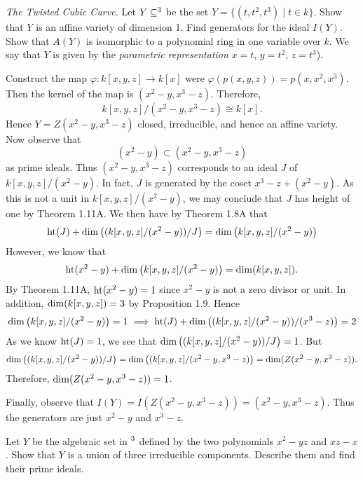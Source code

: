 \documentclass{hw_pset} %
\DeclareMathOperator{\Ht}{\rm{ht}}    %
\DeclareMathOperator{\Dim}{\rm{dim}}  %
\let\aa\relax
\DeclareMathOperator{\aa}{\mathbf{A}} %
\renewcommand{\phi}{\varphi}
\begin{document}
\begin{exercise}[1.2]
    \emph{The Twisted Cubic Curve.}
    Let $Y \subseteq \aa^3$ be the set $Y = \{(t,t^2,t^3) \mid t \in k\}$.
    Show that $Y$ is an affine variety of dimension 1. Find generators 
    for the ideal $I(Y)$. Show that $A(Y)$ is isomorphic to a polynomial ring 
    in one variable over $k$. We say that $Y$ is given by the \emph{parametric representation} 
    $x = t$, $y = t^2$, $z = t^3$). 
\end{exercise}

\begin{solution}
    Construct the map $\phi: k[x,y,z] \to k[x]$ were 
    $\phi(p(x, y, z)) = p(x, x^2, x^3)$. Then the kernel of the 
    map is $(x^2 - y, x^3 - z)$. Therefore, 
    \[
        k[x,y,z]/(x^2 - y, x^3 - z) \cong k[x]. 
    \]
    Hence $Y = Z(x^2 -y, x^3 - z)$ closed, irreducible, and hence an affine 
    variety. 
    Now observe that 
    \[
        (x^2 - y) \subset (x^2 - y, x^3 - z)
    \]
    as prime ideals. Thus $(x^2 - y, x^3 - z)$ corresponds to 
    an ideal $J$ of $k[x,y,z]/(x^2 - y)$. In fact, $J$ is generated by 
    the coset $x^3 - z + (x^2 - y)$. As this is not a unit in $k[x,y,z]/(x^2 - y)$, 
    we may conclude that $J$ has height of one by Theorem 1.11A. We then have by 
    Theorem 1.8A that 
    \[
        \Ht(J) + \Dim\left( (k[x,y,z]/(x^2 - y))/J \right) = \Dim\left( k[x,y,z]/(x^2 - y) \right)
    \]
    However, we know that 
    \[
        \Ht(x^2 - y) + \Dim\left( k[x,y,z]/(x^2 - y) \right) = \Dim( k[x,y,z]).
    \]
    By Theorem 1.11A, $\Ht(x^2 - y) = 1$ since $x^2 - y$ is not a zero divisor or unit.
    In addition, $\Dim(k[x,y,z]) = 3$ by Proposition 1.9. Hence 
    \[
        \Dim\left( k[x,y,z]/(x^2 - y) \right) = 1 \implies 
        \Ht(J) + \Dim\left( (k[x,y,z]/(x^2 - y))/(x^3 - z) \right)
        = 2
    \]
    As we know $\Ht(J) = 1$, we see that 
    $\Dim\left( (k[x,y,z]/(x^2 - y))/J \right) = 1$. 
    But 
    \[
        \Dim\left( (k[x,y,z]/(x^2 - y))/J \right) = 
        \Dim\left( (k[x,y,z]/(x^2 - y, x^3 - z) \right) 
        = \Dim(Z(x^2 - y, x^3 - z)).
    \]
    Therefore, $\Dim(Z(x^2 - y, x^3 - z)) = 1$. 

    Finally, observe that $I(Y) = I(Z(x^2-y, x^3 - z)) = (x^2 - y, x^3 - z)$. 
    Thus the generators are just $x^2 - y$ and $x^3 - z$. 




\end{solution}

\begin{exercise}[1.3]
    Let $Y$ be the algebraic set in $\aa^3$ defined by the two polynomials
    $x^2 - yz$ and $xz - x$.
    Show that $Y$ is a union of three irreducible components.
    Describe them and find their prime ideals.
\end{exercise}
\end{document}
